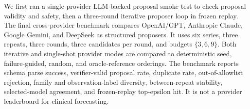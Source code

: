 We first ran a single-provider LLM-backed proposal smoke test to check proposal validity and
safety, then a three-round iterative proposer loop in frozen replay. The final
cross-provider benchmark compares OpenAI/GPT, Anthropic Claude, Google Gemini,
and DeepSeek as structured proposers. It uses six series, three repeats, three
rounds, three candidates per round, and budgets $\{3,6,9\}$. Both iterative
and single-shot provider modes are compared to deterministic seed,
failure-guided, random, and oracle-reference orderings. The benchmark reports
schema parse success, verifier-valid proposal rate, duplicate rate,
out-of-allowlist rejection, family and observation-label diversity,
between-repeat stability, selected-model agreement, and frozen-replay
top-epsilon hit. It is not a provider leaderboard for clinical forecasting.
